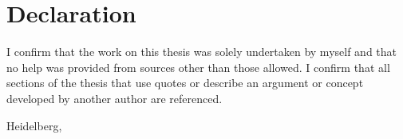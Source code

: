 \makeatletter

\chapter*{Declaration}

I confirm that the work on this thesis was solely undertaken by myself and that no help was provided from sources other than those allowed. I confirm that all sections of the thesis that use quotes or describe an argument or concept developed by another author are referenced.

\vspace{1cm}

\par\noindent%
Heidelberg, \@date \hfill\makebox[2.0in]{\hrulefill}%
\vspace{-\parskip}\par\noindent%
\hfill{}

\makeatother